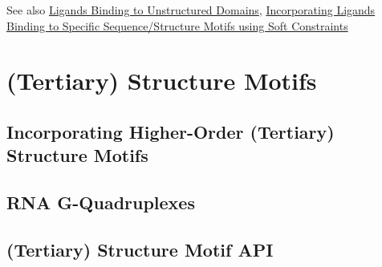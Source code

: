 \begin{DoxySeeAlso}{See also}
\hyperlink{group__ligands__up}{Ligands Binding to Unstructured Domains}, \hyperlink{group__constraints__ligand}{Incorporating Ligands Binding to Specific Sequence/\+Structure Motifs using Soft Constraints}
\end{DoxySeeAlso}
 \hypertarget{structure_motifs}{}\section{(Tertiary) Structure Motifs}\label{structure_motifs}
\hypertarget{structure_motifs_structure_motifs_intro}{}\subsection{Incorporating Higher-\/\+Order (\+Tertiary) Structure Motifs}\label{structure_motifs_structure_motifs_intro}
\hypertarget{structure_motifs_structure_motif_gquad}{}\subsection{R\+N\+A G-\/\+Quadruplexes}\label{structure_motifs_structure_motif_gquad}
\hypertarget{structure_motifs_structure_motif_api}{}\subsection{(\+Tertiary) Structure Motif A\+PI}\label{structure_motifs_structure_motif_api}
 